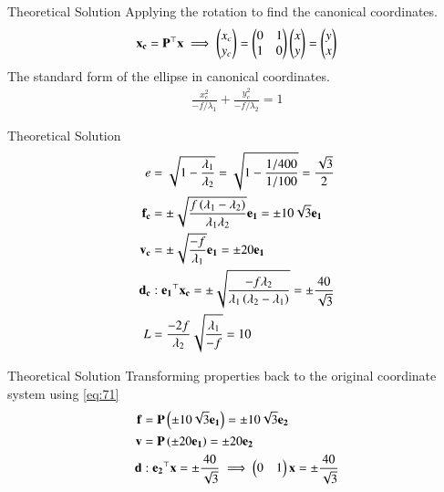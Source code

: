 \documentclass{beamer}
\begin{document}
\begin{frame}{Theoretical Solution}
Applying the rotation to find the canonical coordinates.
\begin{align}
    \mathbf{x_c} = \mathbf{P}^\top\mathbf{x} \implies \begin{pmatrix}x_c \\ y_c\end{pmatrix} = \begin{pmatrix}0 & 1 \\ 1 & 0\end{pmatrix}\begin{pmatrix}x \\ y\end{pmatrix} = \begin{pmatrix}y \\ x\end{pmatrix}
\end{align}
The standard form of the ellipse in canonical coordinates.
\begin{align}
    \frac{x_c^2}{-f/\lambda_1} + \frac{y_c^2}{-f/\lambda_2} = 1
\end{align}
\end{frame}

\begin{frame}{Theoretical Solution}
\begin{align}
    e &= \sqrt{1 - \frac{\lambda_1}{\lambda_2}} = \sqrt{1 - \frac{1/400}{1/100}} = \frac{\sqrt{3}}{2} \\
    \mathbf{f_c} &= \pm\sqrt{\frac{f\left(\lambda_1 - \lambda_2\right)}{\lambda_1\lambda_2}}\mathbf{e_1} = \pm 10\sqrt{3}\mathbf{e_1} \\
    \mathbf{v_c} &= \pm\sqrt{\frac{-f}{\lambda_1}}\mathbf{e_1} = \pm 20\mathbf{e_1} \\
    \mathbf{d_c} &: \mathbf{e_1}^\top\mathbf{x_c} = \pm\sqrt{\frac{-f\lambda_2}{\lambda_1\left(\lambda_2-\lambda_1\right)}} = \pm\frac{40}{\sqrt{3}} \\
    L &= \frac{-2f}{\lambda_2}\sqrt{\frac{\lambda_1}{-f}} = 10
\end{align}
\end{frame}

\begin{frame}{Theoretical Solution}
Transforming properties back to the original coordinate system using \eqref{eq:71}
\begin{align}
    \mathbf{f} &= \mathbf{P}\left(\pm 10\sqrt{3}\mathbf{e_1}\right) = \pm 10\sqrt{3}\mathbf{e_2} \\
    \mathbf{v} &= \mathbf{P}\left(\pm 20\mathbf{e_1}\right) = \pm 20\mathbf{e_2} \\
    \mathbf{d} &: \mathbf{e_2}^\top\mathbf{x} = \pm \frac{40}{\sqrt{3}} \implies \begin{pmatrix}0 & 1\end{pmatrix}\mathbf{x} = \pm \frac{40}{\sqrt{3}}
\end{align}
\end{frame}
\end{document}

